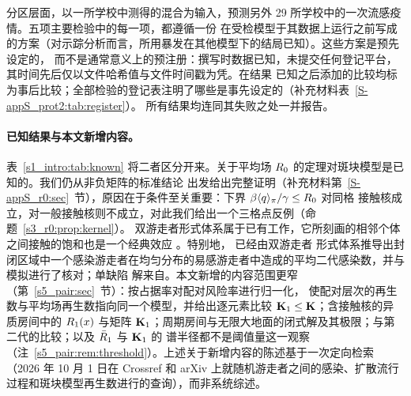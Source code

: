 \begin{enumerate}[label=(\roman*),leftmargin=2.2em,itemsep=1pt,topsep=3pt]
  分区层面，以一所学校中测得的混合为输入，预测另外 29 所学校中的一次流感疫情。五项主要检验中的每一项，都遵循一份
  在受检模型于其数据上运行之前写成的方案（对示踪分析而言，所用暴发在其他模型下的结局已知）。这些方案是预先设定的，
  而不是通常意义上的预注册：撰写时数据已知，未提交任何登记平台，其时间先后仅以文件哈希值与文件时间戳为凭。在结果
  已知之后添加的比较均标为事后比较；全部检验的登记表注明了哪些是事先设定的（补充材料表~\ref{S-appS_prot2:tab:register}）。
  所有结果均连同其失败之处一并报告。
\end{enumerate}

\paragraph{已知结果与本文新增内容。}
表~\ref{s1_intro:tab:known} 将二者区分开来。关于平均场 $R_0$ 的定理对斑块模型是已知的。我们仍从非负矩阵的标准结论
出发给出完整证明（补充材料第~\ref{S-appS_r0:sec}~节），原因在于条件至关重要：下界 $\beta\langle q\rangle_{\pi}/\gamma\le R_0$ 对同格
接触核成立，对一般接触核则不成立，对此我们给出一个三格点反例（命题~\ref{s3_r0:prop:kernel}）。
双游走者形式体系属于已有工作，它所刻画的相邻个体之间接触的饱和也是一个经典效应
\citep{ball1997epidemics,keeling1999effects,durrett1994importance}。特别地，\citet{giuggioli2022spatio} 已经由双游走者
形式体系推导出封闭区域中一个感染游走者在均匀分布的易感游走者中造成的平均二代感染数，并与模拟进行了核对；单缺陷
解来自\citet{szabo1984localized}。本文新增的内容范围更窄（第~\ref{s5_pair:sec}~节）：按占据率对配对风险率进行归一化，
使配对层次的再生数与平均场再生数指向同一个模型，并给出逐元素比较 $\mathbf{K}_1\le\mathbf{K}$；含接触核的异质房间中的
$R_1(x)$ 与矩阵 $\mathbf{K}_1$；周期房间与无限大地面的闭式解及其极限；与第二代的比较；以及 $\bar{R}_1$ 与 $\mathbf{K}_1$ 的
谱半径都不是阈值量这一观察（注~\ref{s5_pair:rem:threshold}）。上述关于新增内容的陈述基于一次定向检索（2026 年
10 月 1 日在 Crossref 和 arXiv 上就随机游走者之间的感染、扩散流行过程和斑块模型再生数进行的查询），而非系统综述。

